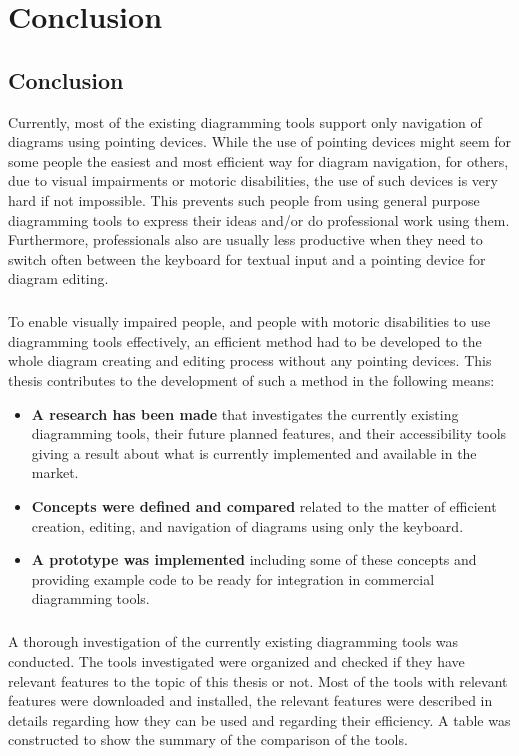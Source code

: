 \chapter{Conclusion}
\beginchapter

\section{Conclusion}
Currently, most of the existing diagramming tools support only navigation of diagrams using pointing devices. While the use of pointing devices might seem for some people the easiest and most efficient way for diagram navigation, for others, due to visual impairments or motoric disabilities, the use of such devices is very hard if not impossible. This prevents such people from using general purpose diagramming tools to express their ideas and/or do professional work using them. Furthermore, professionals also are usually less productive when they need to switch often between the keyboard for textual input and a pointing device for diagram editing. 

\paragraph{}
To enable visually impaired people, and people with motoric disabilities to use diagramming tools effectively, an efficient method had to be developed to the whole diagram creating and editing process without any pointing devices. This thesis contributes to the development of such a method in the following means:
\begin{itemize}
\item {\bf A research has been made} that investigates the currently existing diagramming tools, their future planned features, and their accessibility tools giving a result about what is currently implemented and available in the market.
\item {\bf Concepts were defined and compared} related to the matter of efficient creation, editing, and navigation of diagrams using only the keyboard.
\item {\bf A prototype was implemented} including some of these concepts and providing example code to be ready for integration in commercial diagramming tools.
\end{itemize}

\paragraph{}
A thorough investigation of the currently existing diagramming tools was conducted. The tools investigated were organized and checked if they have relevant features to the topic of this thesis or not. Most of the tools with relevant features were downloaded and installed, the relevant features were described in details regarding how they can be used and regarding their efficiency. A table was constructed to show the summary of the comparison of the tools.

